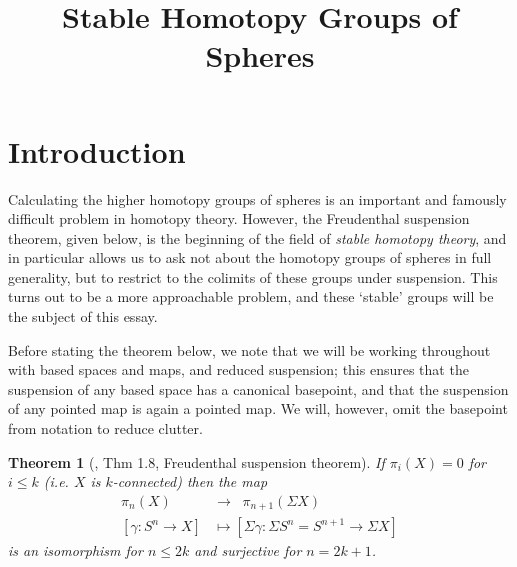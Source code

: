 \documentclass[11pt, titlepage]{article} %
\title{Stable Homotopy Groups of Spheres}
\date{}
\numberwithin{equation}{subsection}
\theoremstyle{plain}
\newtheorem{theorem}{Theorem}[subsection]
\theoremstyle{definition}
\begin{document}
\maketitle


\DeclarePairedDelimiter{\norm}{\lVert}{\rVert} 
\DeclarePairedDelimiter{\abs}{\lvert}{\rvert} 
\DeclarePairedDelimiter{\ang}{\langle}{\rangle} 


\section{Introduction}

Calculating the higher homotopy groups of spheres is an important and famously difficult problem in homotopy theory. However, the Freudenthal suspension theorem, given below, is the beginning of the field of \textit{stable homotopy theory}, and in particular allows us to ask not about the homotopy groups of spheres in full generality, but to restrict to the colimits of these groups under suspension. This turns out to be a more approachable problem, and these `stable' groups will be the subject of this essay. 

Before stating the theorem below, we note that we will be working throughout with based spaces and maps, and reduced suspension; this ensures that the suspension of any based space has a canonical basepoint, and that the suspension of any pointed map is again a pointed map. We will, however, omit the basepoint from notation to reduce clutter. 

\begin{theorem}[{\autocite{ass}, Thm 1.8}, Freudenthal suspension theorem]\label{2504151046}
If \(\pi_i(X)=0\) for \(i\leq k\) (i.e. \(X\) is \(k\)-connected) then the map 
\begin{align*}
\pi_n(X) \;\;&\to\;\; \pi_{n+1}(\Sigma X)\\
[\gamma : S^n \to X] &\mapsto [\Sigma \gamma : \Sigma S^n=S^{n+1} \to \Sigma X]
\end{align*}
is an isomorphism for \(n \leq 2k\) and surjective for \(n=2k+1\).
\end{theorem}
\end{document}
